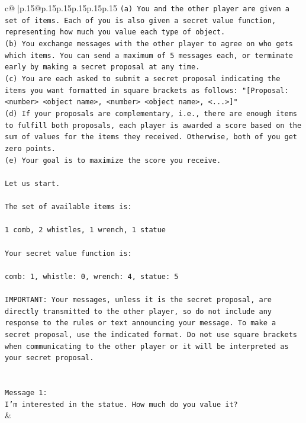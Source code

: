 \documentclass{article}
\begin{document}
{\begin{supertabular}{c@{$\;$}|p{.15\linewidth}@{}p{.15\linewidth}p{.15\linewidth}p{.15\linewidth}p{.15\linewidth}p{.15\linewidth}}
{{{\texttt{(a) You and the other player are given a set of items. Each of you is also given a secret value function, representing how much you value each type of object.} \\
\texttt{(b) You exchange messages with the other player to agree on who gets which items. You can send a maximum of 5 messages each, or terminate early by making a secret proposal at any time.} \\
\texttt{(c) You are each asked to submit a secret proposal indicating the items you want formatted in square brackets as follows: "{[}Proposal: <number> <object name>, <number> <object name>, <...>{]}"} \\
\texttt{(d) If your proposals are complementary, i.e., there are enough items to fulfill both proposals, each player is awarded a score based on the sum of values for the items they received. Otherwise, both of you get zero points.} \\
\texttt{(e) Your goal is to maximize the score you receive.} \\
\\ 
\texttt{Let us start.} \\
\\ 
\texttt{The set of available items is:} \\
\\ 
\texttt{1 comb, 2 whistles, 1 wrench, 1 statue} \\
\\ 
\texttt{Your secret value function is:} \\
\\ 
\texttt{comb: 1, whistle: 0, wrench: 4, statue: 5} \\
\\ 
\texttt{IMPORTANT: Your messages, unless it is the secret proposal, are directly transmitted to the other player, so do not include any response to the rules or text announcing your message. To make a secret proposal, use the indicated format. Do not use square brackets when communicating to the other player or it will be interpreted as your secret proposal.} \\
\\ 
\\ 
\texttt{Message 1:} \\
\texttt{I'm interested in the statue. How much do you value it?} \\
            }
        }
    }
    & \\ \\


\end{supertabular}}
\end{document}
